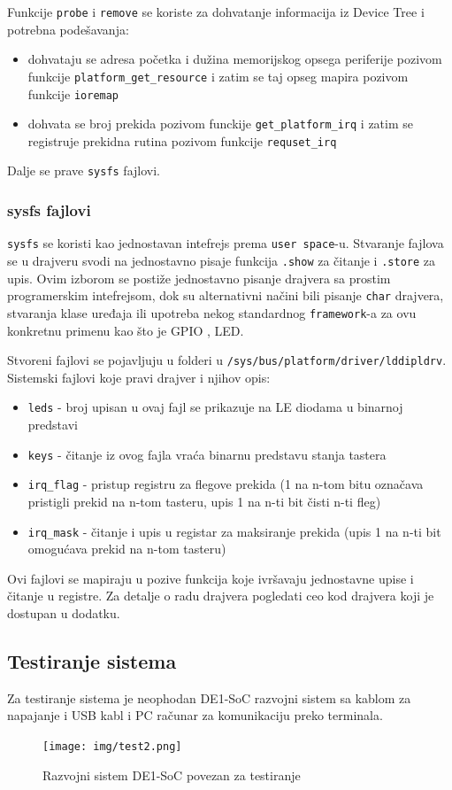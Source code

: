 Funkcije \texttt{probe} i \texttt{remove} se koriste za dohvatanje informacija iz Device Tree i potrebna podešavanja:
\begin{itemize}
\item dohvataju se adresa početka i dužina memorijskog opsega periferije pozivom funkcije \texttt{platform\_get\_resource} i zatim se taj opseg mapira pozivom funkcije \texttt{ioremap}
\item dohvata se broj prekida pozivom funckije \texttt{get\_platform\_irq} i zatim se registruje prekidna rutina pozivom funkcije \texttt{requset\_irq}
\end{itemize}

Dalje se prave \texttt{sysfs} fajlovi.

\subsubsection*{sysfs fajlovi}
\texttt{sysfs} se koristi kao jednostavan intefrejs prema \texttt{user space}-u. Stvaranje fajlova se u drajveru svodi na jednostavno pisaje funkcija \texttt{.show} za čitanje i \texttt{.store} za upis. Ovim izborom se postiže jednostavno pisanje drajvera sa prostim programerskim intefrejsom, dok su alternativni načini bili pisanje \texttt{char} drajvera, stvaranja klase uređaja ili upotreba nekog standardnog \texttt{framework}-a za ovu konkretnu primenu kao što je GPIO	, LED.

Stvoreni fajlovi se pojavljuju u folderi u \texttt{/sys/bus/platform/driver/lddipldrv}. Sistemski fajlovi koje pravi drajver i njihov opis:
\begin{itemize}
\item \texttt{leds} - broj upisan u ovaj fajl se prikazuje na LE diodama u binarnoj predstavi
\item \texttt{keys} - čitanje iz ovog fajla vraća binarnu predstavu stanja tastera
\item \texttt{irq\_flag} - pristup registru za flegove prekida (1 na n-tom bitu označava pristigli prekid na n-tom tasteru, upis 1 na n-ti bit čisti n-ti fleg)
\item \texttt{irq\_mask} - čitanje i upis u registar za maksiranje prekida (upis 1 na n-ti bit omogućava prekid na n-tom tasteru)
\end{itemize}

Ovi fajlovi se mapiraju u pozive funkcija koje ivršavaju jednostavne upise i čitanje u registre. Za detalje o radu drajvera pogledati ceo kod drajvera koji je dostupan u dodatku.
\subsection*{Testiranje sistema}
Za testiranje sistema je neophodan DE1-SoC razvojni sistem sa kablom za napajanje i USB kabl i PC računar za komunikaciju preko terminala.
\begin{figure}[h!]
\centering
\texttt{[image: img/test2.png]}
\caption{Razvojni sistem DE1-SoC povezan za testiranje}
\label{slika1:test2}
\end{figure}

